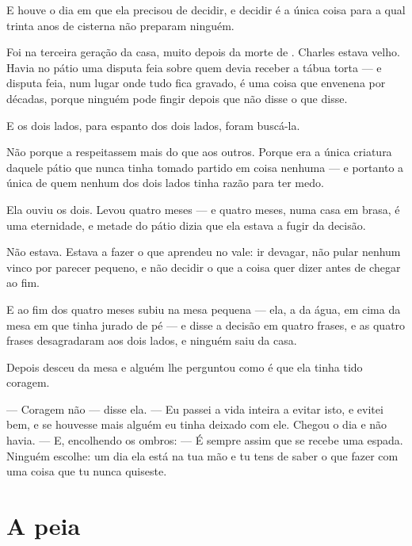 \documentclass[livro.tex]{subfiles}
\begin{document}
E houve o dia em que ela precisou de decidir, e decidir é a única coisa para a qual trinta anos
de cisterna não preparam ninguém.

\medskip

Foi na terceira geração da casa, muito depois da morte de \Ven . Charles estava velho. Havia no
pátio uma disputa feia sobre quem devia receber a tábua torta --- e disputa feia, num lugar onde
tudo fica gravado, é uma coisa que envenena por décadas, porque ninguém pode fingir depois que
não disse o que disse.

E os dois lados, para espanto dos dois lados, foram buscá-la.

Não porque a respeitassem mais do que aos outros. Porque era a única criatura daquele pátio que
nunca tinha tomado partido em coisa nenhuma --- e portanto a única de quem nenhum dos dois lados
tinha razão para ter medo.

\medskip

Ela ouviu os dois. Levou quatro meses --- e quatro meses, numa casa em brasa, é uma eternidade, e
metade do pátio dizia que ela estava a fugir da decisão.

Não estava. Estava a fazer o que aprendeu no vale: ir devagar, não pular nenhum vinco por parecer
pequeno, e não decidir o que a coisa quer dizer antes de chegar ao fim.

E ao fim dos quatro meses subiu na mesa pequena --- ela, a da água, em cima da mesa em que \Ven
tinha jurado de pé --- e disse a decisão em quatro frases, e as quatro frases desagradaram aos
dois lados, e ninguém saiu da casa.

\medskip

Depois desceu da mesa e alguém lhe perguntou como é que ela tinha tido coragem.

--- Coragem não --- disse ela. --- Eu passei a vida inteira a evitar isto, e evitei bem, e se
houvesse mais alguém eu tinha deixado com ele. Chegou o dia e não havia. --- E, encolhendo os
ombros: --- É sempre assim que se recebe uma espada. Ninguém escolhe: um dia ela está na tua mão
e tu tens de saber o que fazer com uma coisa que tu nunca quiseste.

\section{A peia}
\end{document}
